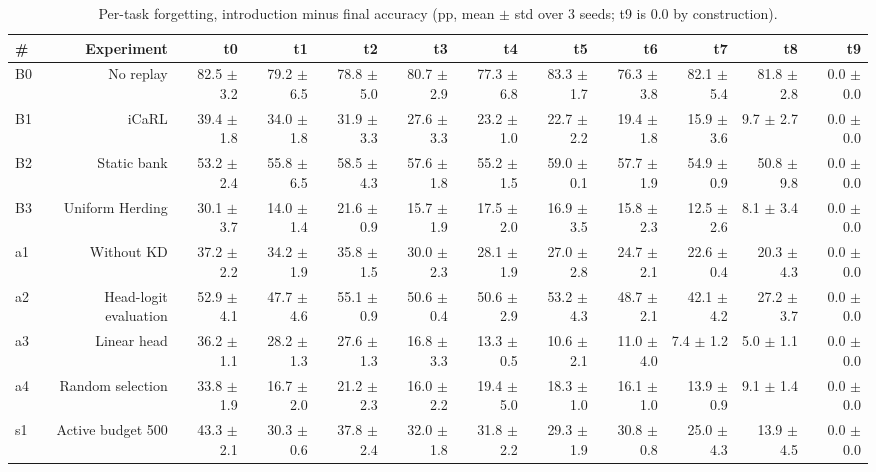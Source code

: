 \documentclass{article}
\begin{document}
\begin{table}[htbp]
  \centering
  \caption{Per-task forgetting, introduction minus final accuracy (pp, mean $\pm$ std over 3 seeds; t9 is 0.0 by construction).}
  \label{tab:A3_per_task_forgetting}
  \begin{tabular}{lrrrrrrrrrrr}
    \toprule
    \textbf{\#} & \textbf{Experiment} & \textbf{t0} & \textbf{t1} & \textbf{t2} & \textbf{t3} & \textbf{t4} & \textbf{t5} & \textbf{t6} & \textbf{t7} & \textbf{t8} & \textbf{t9} \\
    \midrule
    B0 & No replay & 82.5 $\pm$ 3.2 & 79.2 $\pm$ 6.5 & 78.8 $\pm$ 5.0 & 80.7 $\pm$ 2.9 & 77.3 $\pm$ 6.8 & 83.3 $\pm$ 1.7 & 76.3 $\pm$ 3.8 & 82.1 $\pm$ 5.4 & 81.8 $\pm$ 2.8 & 0.0 $\pm$ 0.0 \\
    B1 & iCaRL & 39.4 $\pm$ 1.8 & 34.0 $\pm$ 1.8 & 31.9 $\pm$ 3.3 & 27.6 $\pm$ 3.3 & 23.2 $\pm$ 1.0 & 22.7 $\pm$ 2.2 & 19.4 $\pm$ 1.8 & 15.9 $\pm$ 3.6 & 9.7 $\pm$ 2.7 & 0.0 $\pm$ 0.0 \\
    B2 & Static bank & 53.2 $\pm$ 2.4 & 55.8 $\pm$ 6.5 & 58.5 $\pm$ 4.3 & 57.6 $\pm$ 1.8 & 55.2 $\pm$ 1.5 & 59.0 $\pm$ 0.1 & 57.7 $\pm$ 1.9 & 54.9 $\pm$ 0.9 & 50.8 $\pm$ 9.8 & 0.0 $\pm$ 0.0 \\
    B3 & Uniform Herding & 30.1 $\pm$ 3.7 & 14.0 $\pm$ 1.4 & 21.6 $\pm$ 0.9 & 15.7 $\pm$ 1.9 & 17.5 $\pm$ 2.0 & 16.9 $\pm$ 3.5 & 15.8 $\pm$ 2.3 & 12.5 $\pm$ 2.6 & 8.1 $\pm$ 3.4 & 0.0 $\pm$ 0.0 \\
    a1 & Without KD & 37.2 $\pm$ 2.2 & 34.2 $\pm$ 1.9 & 35.8 $\pm$ 1.5 & 30.0 $\pm$ 2.3 & 28.1 $\pm$ 1.9 & 27.0 $\pm$ 2.8 & 24.7 $\pm$ 2.1 & 22.6 $\pm$ 0.4 & 20.3 $\pm$ 4.3 & 0.0 $\pm$ 0.0 \\
    a2 & Head-logit evaluation & 52.9 $\pm$ 4.1 & 47.7 $\pm$ 4.6 & 55.1 $\pm$ 0.9 & 50.6 $\pm$ 0.4 & 50.6 $\pm$ 2.9 & 53.2 $\pm$ 4.3 & 48.7 $\pm$ 2.1 & 42.1 $\pm$ 4.2 & 27.2 $\pm$ 3.7 & 0.0 $\pm$ 0.0 \\
    a3 & Linear head & 36.2 $\pm$ 1.1 & 28.2 $\pm$ 1.3 & 27.6 $\pm$ 1.3 & 16.8 $\pm$ 3.3 & 13.3 $\pm$ 0.5 & 10.6 $\pm$ 2.1 & 11.0 $\pm$ 4.0 & 7.4 $\pm$ 1.2 & 5.0 $\pm$ 1.1 & 0.0 $\pm$ 0.0 \\
    a4 & Random selection & 33.8 $\pm$ 1.9 & 16.7 $\pm$ 2.0 & 21.2 $\pm$ 2.3 & 16.0 $\pm$ 2.2 & 19.4 $\pm$ 5.0 & 18.3 $\pm$ 1.0 & 16.1 $\pm$ 1.0 & 13.9 $\pm$ 0.9 & 9.1 $\pm$ 1.4 & 0.0 $\pm$ 0.0 \\
    s1 & Active budget 500 & 43.3 $\pm$ 2.1 & 30.3 $\pm$ 0.6 & 37.8 $\pm$ 2.4 & 32.0 $\pm$ 1.8 & 31.8 $\pm$ 2.2 & 29.3 $\pm$ 1.9 & 30.8 $\pm$ 0.8 & 25.0 $\pm$ 4.3 & 13.9 $\pm$ 4.5 & 0.0 $\pm$ 0.0 \\

\end{tabular}
\end{table}
\end{document}
